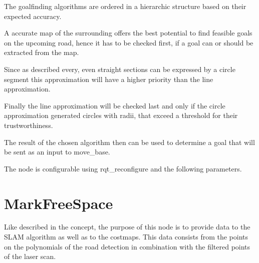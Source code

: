 The goalfinding algorithms are ordered in a hierarchic structure based on their expected accuracy.

A accurate map of the surrounding offers the best potential to find feasible goals on the upcoming road, hence it has to be checked first, if a goal can or should be extracted from the map.

Since as described every, even straight sections can be expressed by a circle segment this approximation will have a higher priority than the line approximation.

Finally the line approximation will be checked last and only if the circle approximation generated circles with radii, that exceed a threshold for their trustworthiness.

The result of the chosen algorithm then can be used to determine a goal that will be sent as an input to move\_base.

The node is configurable using rqt\_reconfigure and the following parameters.

\begin{table}[H]
\centering
{}

\caption{PoseFined parameters}
\label{posefinderparams}

\end{table}

\section{MarkFreeSpace}

Like described in the concept, the purpose of this node is to provide data to the SLAM algorithm as well as to the costmaps. This data consists from the points on the polynomials of the road detection in combination with the filtered points of the laser scan.\\

